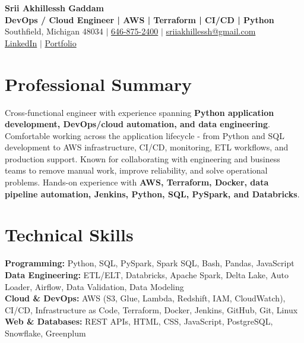 \documentclass[letterpaper,10pt]{article}
\begin{document}
\fontsize{9.35pt}{10.45pt}\selectfont

\begin{center}
    {\LARGE \textbf{Srii Akhillessh Gaddam}} \\[-1pt]
    \textbf{DevOps / Cloud Engineer | AWS | Terraform | CI/CD | Python} \\[2pt]
    Southfield, Michigan 48034 $|$
    \href{tel:6468752400}{646-875-2400} $|$
    \href{mailto:sriiakhillessh@gmail.com}{sriiakhillessh@gmail.com} \\[1pt]
    \href{https://www.linkedin.com/in/srii-akhiilessh-gaddam-b48668191/}{LinkedIn} $|$
    \href{https://sriiakhillesshg.github.io/portfolio/}{Portfolio}
\end{center}
\vspace{-8pt}

\section{Professional Summary}
\small{Cross-functional engineer with experience spanning \textbf{Python application development, DevOps/cloud automation, and data engineering}. Comfortable working across the application lifecycle - from Python and SQL development to AWS infrastructure, CI/CD, monitoring, ETL workflows, and production support. Known for collaborating with engineering and business teams to remove manual work, improve reliability, and solve operational problems. Hands-on experience with \textbf{AWS, Terraform, Docker, data pipeline automation, Jenkins, Python, SQL, PySpark, and Databricks}.}

\section{Technical Skills}
\small{
\textbf{Programming:} Python, SQL, PySpark, Spark SQL, Bash, Pandas, JavaScript \\
\textbf{Data Engineering:} ETL/ELT, Databricks, Apache Spark, Delta Lake, Auto Loader, Airflow, Data Validation, Data Modeling \\
\textbf{Cloud \& DevOps:} AWS (S3, Glue, Lambda, Redshift, IAM, CloudWatch), CI/CD, Infrastructure as Code, Terraform, Docker, Jenkins, GitHub, Git, Linux \\
\textbf{Web \& Databases:} REST APIs, HTML, CSS, JavaScript, PostgreSQL, Snowflake, Greenplum
}
\end{document}
